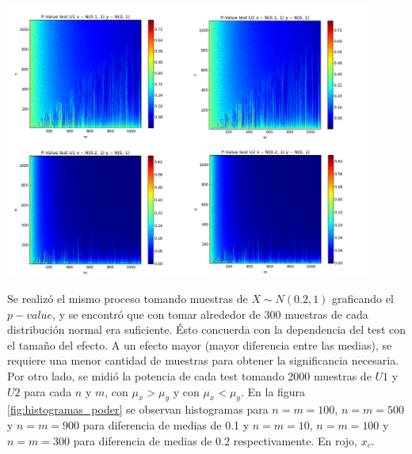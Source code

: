 \documentclass[%
 reprint,
 amsmath,amssymb,
 aps,
spanish]{revtex4-1}
\begin{document}
\begin{minipage}{0.45\textwidth}									
\centering
\includegraphics[width=0.9\textwidth]{imagenes/U1_U2}
    \label{fig:pvalue}
\end{minipage}

Se realizó el mismo proceso tomando muestras de $X \sim N(0.2, 1)$ graficando el $p-value$, y se encontró que con tomar alrededor de 300 muestras de cada distribución 
normal era suficiente. Ésto concuerda con la dependencia del test con el tamaño del efecto. A un efecto mayor (mayor diferencia entre las medias), se requiere una menor cantidad de muestras para 
obtener la significancia necesaria.\\
Por otro lado, se midió la potencia de cada test tomando 2000 muestras de $U1$ y $U2$ para cada $n$ y $m$, con $\mu_x > \mu_y$ y con $\mu_x < \mu_y$. En la figura \ref{fig:histogramas_poder} se 
observan histogramas para $n=m=100$, $n=m=500$ y $n=m=900$ para diferencia de medias de 0.1 y $n=m=10$, $n=m=100$ y $n=m=300$ para diferencia de medias de 0.2 respectivamente. En rojo, $x_c$.\\
\end{document}
